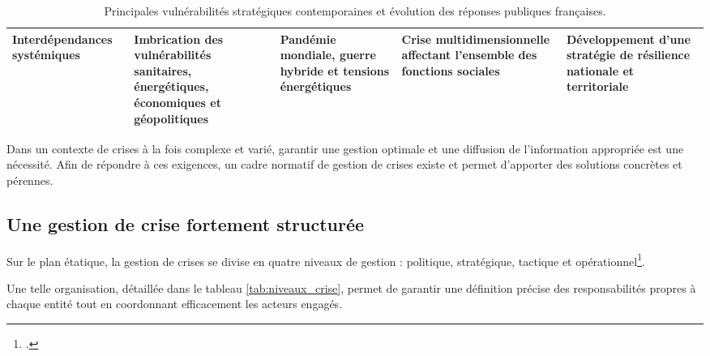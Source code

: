 \documentclass[12pt,a4paper]{article}
\begin{document}
\begin{table}[H]
\begin{tabularx}{\linewidth}{@{}
p{2.8cm}
Y
Y
Y
Y
@{}}
Interdépendances systémiques\footnotemark[\noteVulnerabilitesInterdependances] &
Imbrication des vulnérabilités sanitaires, énergétiques, économiques et géopolitiques &
Pandémie mondiale, guerre hybride et tensions énergétiques &
Crise multidimensionnelle affectant l'ensemble des fonctions sociales &
Développement d'une stratégie de résilience nationale et territoriale \\

\bottomrule
\end{tabularx}

\caption{Principales vulnérabilités stratégiques contemporaines et évolution des réponses publiques françaises.}
\label{tab:vulnerabilites_strategiques_thematique}
\end{table}


\clearpage

Dans un contexte de crises à la fois complexe et varié, garantir une gestion optimale et une diffusion de l'information appropriée est une nécessité. Afin de répondre à ces exigences, un cadre normatif de gestion de crises existe et permet d'apporter des solutions concrètes et pérennes.

\subsection{Une gestion de crise fortement structurée}

Sur le plan étatique, la gestion de crises se divise en quatre niveaux de gestion : politique, stratégique, tactique et opérationnel\footcite{niveaux_gestion_de_crise}.

Une telle organisation, détaillée dans le tableau \ref{tab:niveaux_crise}, permet de garantir une définition précise des responsabilités propres à chaque entité tout en coordonnant efficacement les acteurs engagés.
\end{document}
